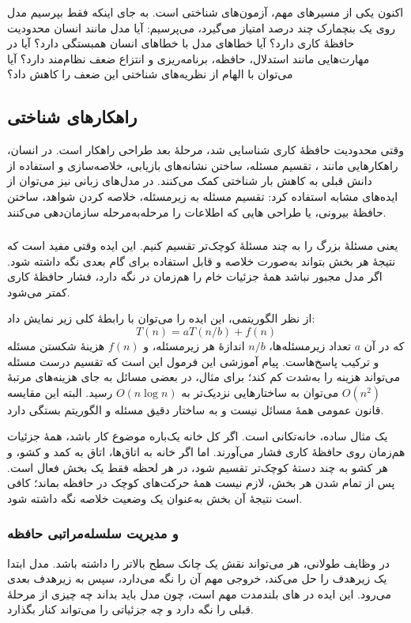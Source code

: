 اکنون یکی از مسیرهای مهم، آزمون‌های شناختی است. به جای اینکه فقط بپرسیم مدل روی یک بنچمارک چند درصد امتیاز می‌گیرد، می‌پرسیم: آیا مدل مانند انسان محدودیت حافظهٔ کاری دارد؟ آیا خطاهای مدل با خطاهای انسان همبستگی دارد؟ آیا در مهارت‌هایی مانند استدلال، حافظه، برنامه‌ریزی و انتزاع ضعف نظام‌مند دارد؟ آیا می‌توان با الهام از نظریه‌های شناختی این ضعف را کاهش داد؟

\subsection{راهکارهای شناختی}
وقتی محدودیت حافظهٔ کاری شناسایی شد، مرحلهٔ بعد طراحی راهکار است. در انسان، راهکارهایی مانند ، تقسیم مسئله، ساختن نشانه‌های بازیابی، خلاصه‌سازی و استفاده از دانش قبلی به کاهش بار شناختی کمک می‌کنند. در مدل‌های زبانی نیز می‌توان از ایده‌های مشابه استفاده کرد: تقسیم مسئله به زیرمسئله، خلاصه کردن شواهد، ساختن حافظهٔ بیرونی، یا طراحی هایی که اطلاعات را مرحله‌به‌مرحله سازمان‌دهی می‌کنند.

\subsubsection{}
 یعنی مسئلهٔ بزرگ را به چند مسئلهٔ کوچک‌تر تقسیم کنیم. این ایده وقتی مفید است که نتیجهٔ هر بخش بتواند به‌صورت خلاصه و قابل استفاده برای گام بعدی نگه داشته شود. اگر مدل مجبور نباشد همهٔ جزئیات خام را هم‌زمان در  نگه دارد، فشار حافظهٔ کاری کمتر می‌شود.

از نظر الگوریتمی، این ایده را می‌توان با رابطهٔ کلی زیر نمایش داد:
\[
T(n)=aT(n/b)+f(n)
\]
که در آن \(a\) تعداد زیرمسئله‌ها، \(n/b\) اندازهٔ هر زیرمسئله، و \(f(n)\) هزینهٔ شکستن مسئله و ترکیب پاسخ‌هاست. پیام آموزشی این فرمول این است که تقسیم درست مسئله می‌تواند هزینه را به‌شدت کم کند؛ برای مثال، در بعضی مسائل به جای هزینه‌های مرتبهٔ \(O(n^2)\) می‌توان به ساختارهایی نزدیک‌تر به \(O(n\log n)\) رسید. البته این مقایسه قانون عمومی همهٔ مسائل نیست و به ساختار دقیق مسئله و الگوریتم بستگی دارد.

یک مثال ساده، خانه‌تکانی است. اگر کل خانه یک‌باره موضوع کار باشد، همهٔ جزئیات هم‌زمان روی حافظهٔ کاری فشار می‌آورند. اما اگر خانه به اتاق‌ها، اتاق به کمد و کشو، و هر کشو به چند دستهٔ کوچک‌تر تقسیم شود، در هر لحظه فقط یک بخش فعال است. پس از تمام شدن هر بخش، لازم نیست همهٔ حرکت‌های کوچک در حافظه بماند؛ کافی است نتیجهٔ آن بخش به‌عنوان یک وضعیت خلاصه نگه داشته شود.

\subsubsection{ و مدیریت سلسله‌مراتبی حافظه}
در وظایف طولانی، هر  می‌تواند نقش یک چانک سطح بالاتر را داشته باشد. مدل ابتدا یک زیرهدف را حل می‌کند، خروجی مهم آن را نگه می‌دارد، سپس به زیرهدف بعدی می‌رود. این ایده در های بلندمدت مهم است، چون مدل باید بداند چه چیزی از مرحلهٔ قبلی را نگه دارد و چه جزئیاتی را می‌تواند کنار بگذارد.

